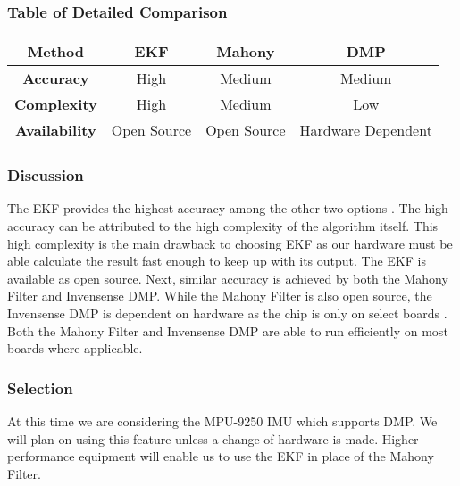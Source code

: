 \subsubsection{Table of Detailed Comparison}
\hfill \break
\begin{center}
\begin{tabular}{|c|c|c|c|}
\hline
\textbf{Method}       & \textbf{EKF} & \textbf{Mahony} & \textbf{DMP} 		\\ \hline
\textbf{Accuracy}     & High  		 & Medium          & Medium 			\\ \hline
\textbf{Complexity}   & High  		 & Medium          & Low				\\ \hline
\textbf{Availability} & Open Source  & Open Source     & Hardware Dependent	\\ \hline
\end{tabular}
\end{center}

\hfill \break
\subsubsection{Discussion}
The EKF provides the highest accuracy among the other two options \cite{EFK_MAHONY}.
The high accuracy can be attributed to the high complexity of the algorithm itself.
This high complexity is the main drawback to choosing EKF as our hardware must be able calculate the result fast enough to keep up with its output.
The EKF is available as open source. Next, similar accuracy is achieved by both the Mahony Filter and Invensense DMP.
While the Mahony Filter is also open source, the Invensense DMP is dependent on hardware as the chip is only on select boards \cite{MPU9250SDK}.
Both the Mahony Filter and Invensense DMP are able to run efficiently on most boards where applicable. \\

\subsubsection{Selection}
At this time we are considering the MPU-9250 IMU which supports DMP.
We will plan on using this feature unless a change of hardware is made.
Higher performance equipment will enable us to use the EKF in place of the Mahony Filter. \\

